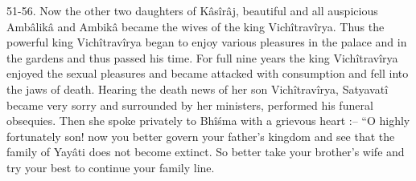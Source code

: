 51-56. Now the other two daughters of K\^as\^ir\^aj, beautiful and all auspicious Amb\^alik\^a and Ambik\^a became the wives of the king Vich\^itrav\^irya. Thus the powerful king Vich\^itrav\^irya began to enjoy various pleasures in the palace and in the gardens and thus passed his time. For full nine years the king Vich\^itrav\^irya enjoyed the sexual pleasures and became attacked with consumption and fell into the jaws of death. Hearing the death news of her son Vich\^itrav\^irya, Satyavat\^i became very sorry and surrounded by her ministers, performed his funeral obsequies. Then she spoke privately to Bh\^i\'sma with a grievous heart :-- ``O highly fortunately son! now you better govern your father's kingdom and see that the family of Yay\^ati does not become extinct. So better take your brother's wife and try your best to continue your family line.

